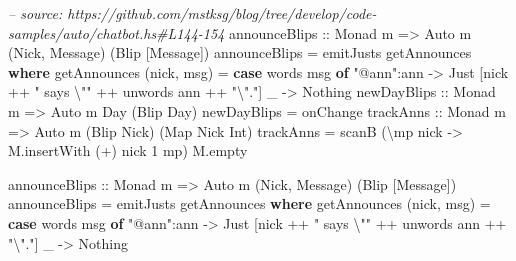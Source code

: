 \documentclass[]{article}
\newenvironment{Shaded}{}{}
\newcommand{\KeywordTok}[1]{\textcolor[rgb]{0.00,0.44,0.13}{\textbf{{#1}}}}
\newcommand{\DataTypeTok}[1]{\textcolor[rgb]{0.56,0.13,0.00}{{#1}}}
\newcommand{\DecValTok}[1]{\textcolor[rgb]{0.25,0.63,0.44}{{#1}}}
\newcommand{\StringTok}[1]{\textcolor[rgb]{0.25,0.44,0.63}{{#1}}}
\newcommand{\CommentTok}[1]{\textcolor[rgb]{0.38,0.63,0.69}{\textit{{#1}}}}
\newcommand{\OtherTok}[1]{\textcolor[rgb]{0.00,0.44,0.13}{{#1}}}
\newcommand{\FunctionTok}[1]{\textcolor[rgb]{0.02,0.16,0.49}{{#1}}}
\newcommand{\NormalTok}[1]{{#1}}
\begin{document}
\begin{Shaded}
\begin{Highlighting}[]
\CommentTok{-- source: https://github.com/mstksg/blog/tree/develop/code-samples/auto/chatbot.hs#L144-154}
\OtherTok{    announceBlips ::} \DataTypeTok{Monad} \NormalTok{m }\OtherTok{=>} \DataTypeTok{Auto} \NormalTok{m (}\DataTypeTok{Nick}\NormalTok{, }\DataTypeTok{Message}\NormalTok{) (}\DataTypeTok{Blip} \NormalTok{[}\DataTypeTok{Message}\NormalTok{])}
    \NormalTok{announceBlips }\FunctionTok{=} \NormalTok{emitJusts getAnnounces}
      \KeywordTok{where}
        \NormalTok{getAnnounces (nick, msg) }\FunctionTok{=}
          \KeywordTok{case} \NormalTok{words msg }\KeywordTok{of}
            \StringTok{"@ann"}\FunctionTok{:}\NormalTok{ann }\OtherTok{->} \DataTypeTok{Just} \NormalTok{[nick }\FunctionTok{++} \StringTok{" says \textbackslash{}""} \FunctionTok{++} \NormalTok{unwords ann }\FunctionTok{++} \StringTok{"\textbackslash{}"."}\NormalTok{]}
            \NormalTok{_          }\OtherTok{->} \DataTypeTok{Nothing}
\OtherTok{    newDayBlips ::} \DataTypeTok{Monad} \NormalTok{m }\OtherTok{=>} \DataTypeTok{Auto} \NormalTok{m }\DataTypeTok{Day} \NormalTok{(}\DataTypeTok{Blip} \DataTypeTok{Day}\NormalTok{)}
    \NormalTok{newDayBlips }\FunctionTok{=} \NormalTok{onChange}
\OtherTok{    trackAnns ::} \DataTypeTok{Monad} \NormalTok{m }\OtherTok{=>} \DataTypeTok{Auto} \NormalTok{m (}\DataTypeTok{Blip} \DataTypeTok{Nick}\NormalTok{) (}\DataTypeTok{Map} \DataTypeTok{Nick} \DataTypeTok{Int}\NormalTok{)}
    \NormalTok{trackAnns }\FunctionTok{=} \NormalTok{scanB (\textbackslash{}mp nick }\OtherTok{->} \NormalTok{M.insertWith (}\FunctionTok{+}\NormalTok{) nick }\DecValTok{1} \NormalTok{mp) M.empty}



\OtherTok{announceBlips ::} \DataTypeTok{Monad} \NormalTok{m }\OtherTok{=>} \DataTypeTok{Auto} \NormalTok{m (}\DataTypeTok{Nick}\NormalTok{, }\DataTypeTok{Message}\NormalTok{) (}\DataTypeTok{Blip} \NormalTok{[}\DataTypeTok{Message}\NormalTok{])}
\NormalTok{announceBlips }\FunctionTok{=} \NormalTok{emitJusts getAnnounces}
  \KeywordTok{where}
    \NormalTok{getAnnounces (nick, msg) }\FunctionTok{=}
      \KeywordTok{case} \NormalTok{words msg }\KeywordTok{of}
        \StringTok{"@ann"}\FunctionTok{:}\NormalTok{ann }\OtherTok{->} \DataTypeTok{Just} \NormalTok{[nick }\FunctionTok{++} \StringTok{" says \textbackslash{}""} \FunctionTok{++} \NormalTok{unwords ann }\FunctionTok{++} \StringTok{"\textbackslash{}"."}\NormalTok{]}
        \NormalTok{_          }\OtherTok{->} \DataTypeTok{Nothing}
\end{Highlighting}
\end{Shaded}
\end{document}
